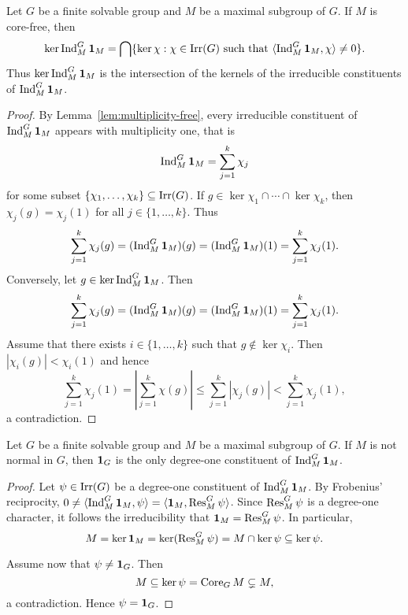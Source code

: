 \begin{lemma}
\label{lem:kernel}
    Let $G$ be a finite solvable group and $M$ be a maximal subgroup of $G$. If $M$ is core-free, then 
    \[
    \ker\operatorname{Ind}_M^G\mathbf{1}_M=\bigcap\{\ker\chi:\chi\in\operatorname{Irr}(G)\text{ such that }\langle\operatorname{Ind}_M^G\mathbf{1}_M,\chi\rangle\ne0\}.
    \]
    Thus $\ker\operatorname{Ind}_M^G\mathbf{1}_M$ is the intersection of the kernels of the irreducible constituents 
    of $\operatorname{Ind}_M^G\mathbf{1}_M$.
\end{lemma}

\begin{proof}
    By Lemma~\ref{lem:multiplicity-free}, every irreducible constituent of 
    $\operatorname{Ind}_M^G\mathbf{1}_M$ appears with multiplicity one, that is 
    \[
    \operatorname{Ind}_M^G\mathbf{1}_M=\sum_{j=1}^k\chi_j
    \]
    for some subset $\{\chi_1,\dots,\chi_k\}\subseteq\operatorname{Irr}(G)$. If $g\in\ker\chi_1\cap\cdots\cap\ker\chi_k$, then
    $\chi_j(g)=\chi_j(1)$ for all $j\in\{1,\dots,k\}$. Thus 
    \[
    \sum_{j=1}^k\chi_j(g)=(\operatorname{Ind}_M^G\mathbf{1}_M)(g)=(\operatorname{Ind}_M^G\mathbf{1}_M)(1)=\sum_{j=1}^k\chi_j(1). 
    \]
    Conversely, let $g\in\ker\operatorname{Ind}_M^G\mathbf{1}_M$. 
    Then 
    \[
    \sum_{j=1}^k\chi_j(g)=(\operatorname{Ind}_M^G\mathbf{1}_M)(g)=(\operatorname{Ind}_M^G\mathbf{1}_M)(1)=\sum_{j=1}^k\chi_j(1).
    \]
    Assume that there exists 
    $i\in\{1,\dots,k\}$ such that 
    $g\not\in\ker\chi_i$. Then 
    $|\chi_i(g)|<\chi_i(1)$ and hence 
    \[
    \sum_{j=1}^k\chi_j(1)=\left|\sum_{j=1}^k\chi(g)\right|\leq
    \sum_{j=1}^k|\chi_j(g)|<\sum_{j=1}^k\chi_j(1),
    \]
    a contradiction. 
\end{proof}

\begin{lemma}
    Let $G$ be a finite solvable group and $M$ be a  
    maximal subgroup of $G$. If $M$ is not normal in $G$, 
    then $\mathbf{1}_G$ is the only degree-one constituent of $\operatorname{Ind}_M^G\mathbf{1}_M$. 
\end{lemma}

\begin{proof}
    Let $\psi\in\operatorname{Irr}(G)$ be a degree-one constituent of $\operatorname{Ind}_M^G\mathbf{1}_M$. 
    By Frobenius' reciprocity, $0\ne\langle\operatorname{Ind}_M^G\mathbf{1}_M,\psi\rangle=\langle\mathbf{1}_M,\operatorname{Res}_M^G\psi\rangle$.
    Since $\operatorname{Res}_M^G\psi$ is a degree-one character, it follows the irreducibility that 
    $\mathbf{1}_M=\operatorname{Res}_M^G\psi$. In particular, 
    \[
    M=\ker\mathbf{1}_M=\ker(\operatorname{Res}_M^G\psi)=M\cap\ker\psi\subseteq\ker\psi. 
    \]
    
    Assume now that $\psi\ne\mathbf{1}_G$. Then 
    \[
    M\subseteq \ker\psi=\operatorname{Core}_GM\subsetneq M,
    \]
    a contradiction. Hence $\psi=\mathbf{1}_G$. 
\end{proof}

